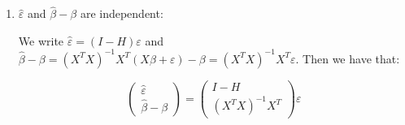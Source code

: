 \begin{enumerate}[label=Step \arabic*., align=left]
          Observe that the $\hat{\beta}$ follows multivariate normal distribution since $\hat{\beta} = Ay$ where $A = (X^TX)^{-1}X^T$, and $y \sim \mathcal{N}(X\beta, \sigma^2 I)$ (see Lemma~\ref{lem:multinormal}). 
          Therefore $\hat{\beta} \sim \mathcal{N} (\beta, \sigma^2 AA^T)$, where we have used that $\hat{\beta}$ is an unbiased estimator of $\beta$ and that
          \[\cov(\hat{\beta}) 
              = \cov(Ay)
              = A\cov(y)A^T
              = \sigma^2 AA^T\]
          by \ref{prop:covariance linearity}.
          \[AA^T 
                  = (X^TX)^{-1} X^T X \left((X^TX)^{-1}\right)^T
              = \left((X^TX)^{-1}\right)^T
              = \left((X^TX)^T\right)^{-1}
              = (X^TX)^{-1}\]
          
          As was derived above, we have that $\hat{\beta} \sim \mathcal{N} (\beta, \sigma^2 (X^TX)^{-1})$. Therefore we have that:
          \[\hat{\beta}_i - \beta_i \sim \mathcal{N}(0, \sigma^2 (X^TX)^{-1}_{ii})\]
          
          Thus:
          \[\frac{\hat{\beta}_i - \beta_i}{\sigma \sqrt{(X^TX)^{-1}_{ii}}} \sim \mathcal{N}(0, 1)\]
    \item $\hat{\varepsilon}$ and $\hat{\beta} - \beta$ are independent:
          
          We write $\hat{\varepsilon} = (I - H) \varepsilon$ and $\hat{\beta} - \beta = (X^TX)^{-1} X^T (X\beta + \varepsilon) - \beta = (X^TX)^{-1} X^T \varepsilon$. Then we have that:
          
          \[\begin{pmatrix}                    
                  \hat{\varepsilon} \\ 
                  \hat{\beta} - \beta
              \end{pmatrix} =
              \begin{pmatrix}                    
                  I - H \\
                  (X^TX)^{-1} X^T
              \end{pmatrix} \varepsilon\]
          

\end{enumerate}
